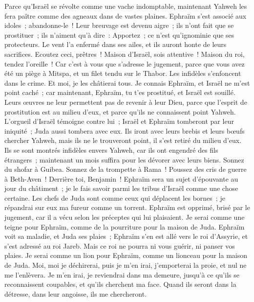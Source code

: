 \begin{multicols}{2}
Parce qu'Israël se révolte comme une vache indomptable, maintenant Yahweh les fera paître comme des agneaux dans de vastes plaines.
Ephraïm s'est associé aux idoles~; abandonne-le~!
Leur breuvage est devenu aigre~; ils n'ont fait que se prostituer~; ils n'aiment qu'à dire~: Apportez~; ce n'est qu'ignominie que ses protecteurs.
Le vent l'a enfermé dans ses ailes, et ils auront honte de leurs sacrifices.
\VerseOne{}Ecoutez ceci, prêtres~! Maison d'Israël, sois attentive~! Maison du roi, tendez l'oreille~! Car c'est à vous que s'adresse le jugement, parce que vous avez été un piège à Mitspa, et un filet tendu sur le Thabor.
Les infidèles s'enfoncent dans le crime. Et moi, je les châtierai tous.
Je connais Ephraïm, et Israël ne m'est point caché~; car maintenant, Ephraïm, tu t'es prostitué, et Israël est souillé.
Leurs œuvres ne leur permettent pas de revenir à leur Dieu, parce que l'esprit de prostitution est au milieu d'eux, et parce qu'ils ne connaissent point Yahweh.
L'orgueil d'Israël témoigne contre lui~; Israël et Ephraïm tomberont par leur iniquité~; Juda aussi tombera avec eux.
Ils iront avec leurs brebis et leurs bœufs chercher Yahweh, mais ils ne le trouveront point, il s'est retiré du milieu d'eux.
Ils se sont montrés infidèles envers Yahweh, car ils ont engendré des fils étrangers~; maintenant un mois suffira pour les dévorer avec leurs biens.
Sonnez du shofar à Guibea. Sonnez de la trompette à Rama~! Poussez des cris de guerre à Beth-Aven~! Derrière toi, Benjamin~!
Ephraïm sera un sujet d'épouvante au jour du châtiment~; je le fais savoir parmi les tribus d'Israël comme une chose certaine.
Les chefs de Juda sont comme ceux qui déplacent les bornes~; je répandrai sur eux ma fureur comme un torrent.
Ephraïm est opprimé, brisé par le jugement, car il a vécu selon les préceptes qui lui plaisaient.
Je serai comme une teigne pour Ephraïm, comme de la pourriture pour la maison de Juda.
Ephraïm voit sa maladie, et Juda ses plaies~; Ephraïm s'en est allé vers le roi d'Assyrie, et s'est adressé au roi Jareb. Mais ce roi ne pourra ni vous guérir, ni panser vos plaies.
Je serai comme un lion pour Ephraïm, comme un lionceau pour la maison de Juda. Moi, moi je déchirerai, puis je m'en irai, j'emporterai la proie, et nul ne me l'enlèvera.
Je m'en irai, je reviendrai dans ma demeure, jusqu'à ce qu'ils se reconnaissent coupables, et qu'ils cherchent ma face. Quand ils seront dans la détresse, dans leur angoisse, ils me chercheront.

\end{multicols}
